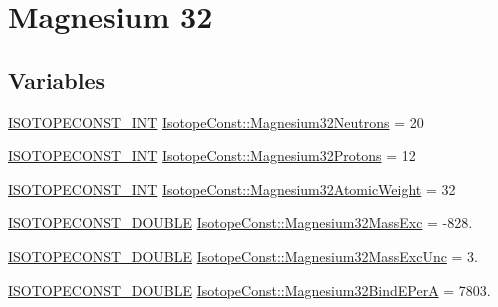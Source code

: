 \hypertarget{group___isotope_const-_magnesium-_mg32}{}\section{Magnesium 32}
\label{group___isotope_const-_magnesium-_mg32}
\subsection*{Variables}
\begin{DoxyCompactItemize}
\item 
\mbox{\hyperlink{group___isotope_const-_macros_ga5f18360b3e99483a35c32d789e62621c}{I\+S\+O\+T\+O\+P\+E\+C\+O\+N\+S\+T\+\_\+\+I\+NT}} \mbox{\hyperlink{group___isotope_const-_magnesium-_mg32_ga39af751c7ce221e030b74993ecf1d431}{Isotope\+Const\+::\+Magnesium32\+Neutrons}} = 20
\item 
\mbox{\hyperlink{group___isotope_const-_macros_ga5f18360b3e99483a35c32d789e62621c}{I\+S\+O\+T\+O\+P\+E\+C\+O\+N\+S\+T\+\_\+\+I\+NT}} \mbox{\hyperlink{group___isotope_const-_magnesium-_mg32_ga40b718dab67db8f97bd8f7e65a3e2fb6}{Isotope\+Const\+::\+Magnesium32\+Protons}} = 12
\item 
\mbox{\hyperlink{group___isotope_const-_macros_ga5f18360b3e99483a35c32d789e62621c}{I\+S\+O\+T\+O\+P\+E\+C\+O\+N\+S\+T\+\_\+\+I\+NT}} \mbox{\hyperlink{group___isotope_const-_magnesium-_mg32_ga793176bdd99c8a17860416ab58b39f6a}{Isotope\+Const\+::\+Magnesium32\+Atomic\+Weight}} = 32
\item 
\mbox{\hyperlink{group___isotope_const-_macros_ga8f45a7272ce02c0b4c65c44636ed719a}{I\+S\+O\+T\+O\+P\+E\+C\+O\+N\+S\+T\+\_\+\+D\+O\+U\+B\+LE}} \mbox{\hyperlink{group___isotope_const-_magnesium-_mg32_ga6c075b8a068310806dfd4e8245c6cc0e}{Isotope\+Const\+::\+Magnesium32\+Mass\+Exc}} = -\/828.
\item 
\mbox{\hyperlink{group___isotope_const-_macros_ga8f45a7272ce02c0b4c65c44636ed719a}{I\+S\+O\+T\+O\+P\+E\+C\+O\+N\+S\+T\+\_\+\+D\+O\+U\+B\+LE}} \mbox{\hyperlink{group___isotope_const-_magnesium-_mg32_ga8143c19e5ae6cc053a299ff865a62d29}{Isotope\+Const\+::\+Magnesium32\+Mass\+Exc\+Unc}} = 3.
\item 
\mbox{\hyperlink{group___isotope_const-_macros_ga8f45a7272ce02c0b4c65c44636ed719a}{I\+S\+O\+T\+O\+P\+E\+C\+O\+N\+S\+T\+\_\+\+D\+O\+U\+B\+LE}} \mbox{\hyperlink{group___isotope_const-_magnesium-_mg32_ga6109ac9239b40f6bc41c2a6cae8884e1}{Isotope\+Const\+::\+Magnesium32\+Bind\+E\+PerA}} = 7803.
\item 

\end{DoxyCompactItemize}
